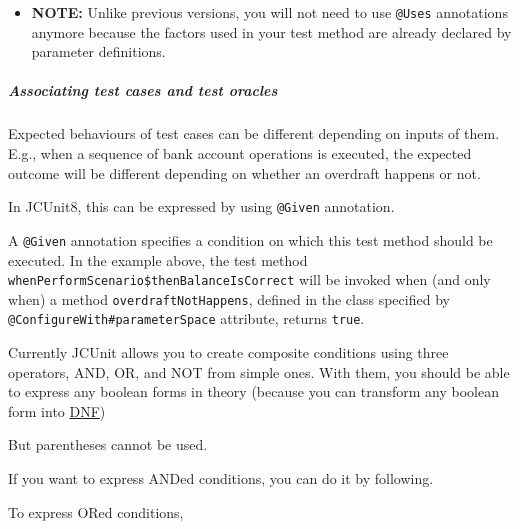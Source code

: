 \begin{itemize}
\tightlist
\item
  \textbf{NOTE:} Unlike previous versions, you will not need to use
  \texttt{@Uses} annotations anymore because the factors used in your
  test method are already declared by parameter definitions.
\end{itemize}

\subparagraph{Associating test cases and test
oracles}\label{associating-test-cases-and-test-oracles}

Expected behaviours of test cases can be different depending on inputs
of them. E.g., when a sequence of bank account operations is executed,
the expected outcome will be different depending on whether an overdraft
happens or not.

In JCUnit8, this can be expressed by using \texttt{@Given} annotation.

A \texttt{@Given} annotation specifies a condition on which this test
method should be executed. In the example above, the test method
\texttt{whenPerformScenario\$thenBalanceIsCorrect} will be invoked when
(and only when) a method \texttt{overdraftNotHappens}, defined in the
class specified by \texttt{@ConfigureWith\#parameterSpace} attribute,
returns \texttt{true}.

Currently JCUnit allows you to create composite conditions using three
operators, AND, OR, and NOT from simple ones. With them, you should be
able to express any boolean forms in theory (because you can transform
any boolean form into
\href{https://en.wikipedia.org/wiki/Disjunctive_normal_form}{DNF})

But parentheses cannot be used.

If you want to express ANDed conditions, you can do it by following.

\begin{Shaded}
\begin{Highlighting}[]

      \NormalTok{(}\NormalTok{)}
        
\end{Highlighting}
\end{Shaded}

To express ORed conditions,

\begin{Shaded}
\begin{Highlighting}[]

      \NormalTok{(\{}\NormalTok{, }\NormalTok{\})}
        
\end{Highlighting}
\end{Shaded}

